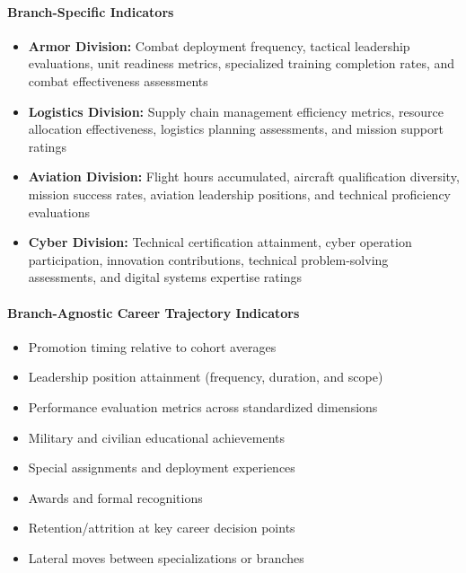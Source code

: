 \documentclass[../main.tex]{subfiles}
\begin{document}

\paragraph{Branch-Specific Indicators}
\begin{itemize}
\item \textbf{Armor Division:} Combat deployment frequency, tactical leadership evaluations, unit readiness metrics, specialized training completion rates, and combat effectiveness assessments
\item \textbf{Logistics Division:} Supply chain management efficiency metrics, resource allocation effectiveness, logistics planning assessments, and mission support ratings
\item \textbf{Aviation Division:} Flight hours accumulated, aircraft qualification diversity, mission success rates, aviation leadership positions, and technical proficiency evaluations
\item \textbf{Cyber Division:} Technical certification attainment, cyber operation participation, innovation contributions, technical problem-solving assessments, and digital systems expertise ratings
\end{itemize}

\paragraph{Branch-Agnostic Career Trajectory Indicators}
\begin{itemize}
\item Promotion timing relative to cohort averages
\item Leadership position attainment (frequency, duration, and scope)
\item Performance evaluation metrics across standardized dimensions
\item Military and civilian educational achievements
\item Special assignments and deployment experiences
\item Awards and formal recognitions
\item Retention/attrition at key career decision points
\item Lateral moves between specializations or branches
\end{itemize}
\end{document}
